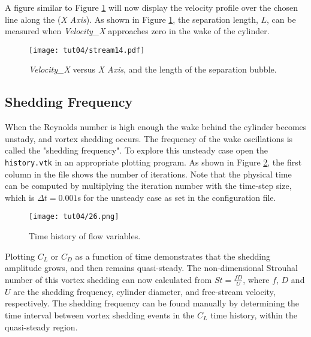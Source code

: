 A figure similar to Figure \ref{fig4:stream14_4} will now display the velocity profile over the chosen line along the (\textit{X Axis}). As shown in Figure \ref{fig4:stream14_4}, the separation length, $L$, can be measured when \textit{Velocity\_X} approaches zero in the wake of the cylinder.
\begin{figure}[ht]
    \centering
    \texttt{[image: tut04/stream14.pdf]}
    \caption{\textit{Velocity\_X} versus \textit{X Axis}, and the length of the separation bubble.}
    \label{fig4:stream14_4}
\end{figure}
\subsection{Shedding Frequency}
When the Reynolds number is high enough the wake behind the cylinder becomes unstady, and vortex shedding occurs. The frequency of the wake oscillations is called the "shedding frequency". To explore this unsteady case open the \texttt{history.vtk} in an appropriate plotting program. As shown in Figure \ref{fig4:time_history}, the first column in the file shows the number of iterations. Note that the physical time can be computed by multiplying the iteration number with the time-step size, which is $\Delta t = 0.001$s for the unsteady case as set in the configuration file.
\begin{figure}[ht]
    \centering
    \texttt{[image: tut04/26.png]}
    \caption{Time history of flow variables.}
    \label{fig4:time_history}
\end{figure}
Plotting $C_L$ or $C_D$ as a function of time demonstrates that the shedding amplitude grows, and then remains quasi-steady. The non-dimensional Strouhal number of this vortex shedding can now calculated from $St=\frac{f D}{U}$, where $f$, $D$ and $U$ are the shedding frequency, cylinder diameter, and free-stream velocity, respectively. The shedding frequency can be found manually by determining the time interval between vortex shedding events in the $C_L$ time history, within the quasi-steady region.
